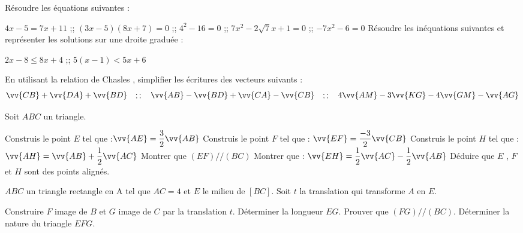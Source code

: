 \documentclass[a4paper,addpoints,12pt]{exam}
\begin{document}
\devoir[prv=false,ds=false,num=4 ,niv=3,sem=2 ,date=23/02/2023,Rdate=27/02/2023]

\begin{exo}
\begin{questions}
\question Résoudre les équations suivantes :

$4x-5=7x+11$ ;; $(3x-5)(8x+7)=0$ ;; $4^{2}-16=0$ ;; $7x^{2}-2\sqrt{7}x+1=0$ ;; $-7x^{2}-6=0$
\question Résoudre les inéquations suivantes et représenter les solutions sur une droite graduée :

$2x-8\leq 8x+4$ ;; $5(x-1)< 5x+6$
\end{questions}
\end{exo}

\begin{exo}
\begin{questions}
\question En utilisant la relation de Chasles , simplifier les écritures des vecteurs suivants :
\[
\vv{CB}+\vv{DA}+\vv{BD}\quad ;;\quad
 \vv{AB}-\vv{BD}+\vv{CA}-\vv{CB}\quad ;;\quad
 4\vv{AM}-3\vv{KG}-4\vv{GM}-\vv{AG}
\]
\end{questions}
\end{exo}

\begin{exo}
Soit $ABC$ un triangle.
\begin{questions}
\question Construis le point $E$ tel que :$\vv{AE}=\dfrac{3}{2}\vv{AB}$
\question Construis le point $F$ tel que : $\vv{EF}=\dfrac{-3}{2}\vv{CB}$
\question Construis le point $H$ tel que : $\vv{AH}=\vv{AB}+\dfrac{1}{2}\vv{AC}$
\question Montrer que $(EF)//(BC)$
\question Montrer que : $\vv{EH}=\dfrac{1}{2}\vv{AC}-\dfrac{1}{2}\vv{AB}$
\question Déduire que $E$ , $F$ et $H$ sont des points alignés.
\end{questions}
\end{exo}


\begin{exo}
$ABC$ un triangle rectangle en A tel que $AC=4 $ et $E$ le milieu de $[BC]$. Soit $t$ la translation qui transforme $A$ en $E$.
\begin{questions}
\question Construire $F$ image de $B$ et $G$ image de $C$ par la translation $t$.
\question Déterminer la longueur $EG$.
\question Prouver que $(FG)//(BC)$.
\question Déterminer la nature du triangle $EFG$. 
\end{questions}
\end{exo}
\end{document}
